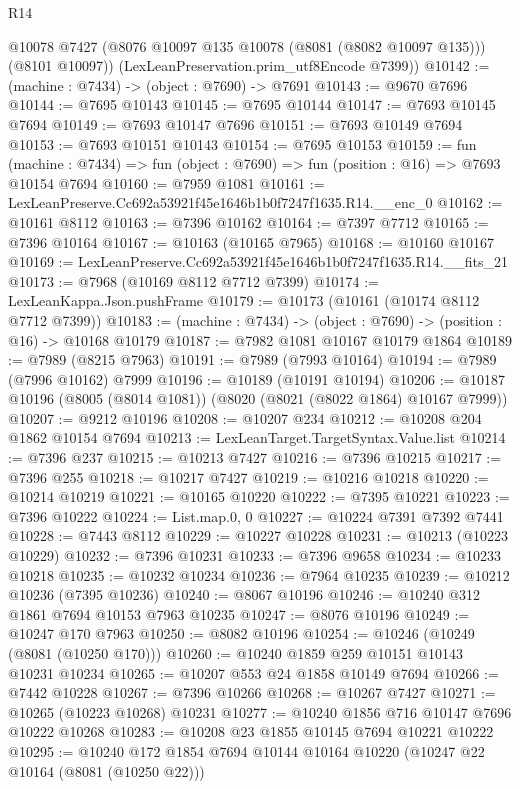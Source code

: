 \begin{lexlean}{R14}
\begin{coremodule}
        @10078
        @7427
        (@8076 @10097 @135 @10078 (@8081 (@8082 @10097 @135)))
        (@8101 @10097))
      (LexLeanPreservation.prim_utf8Encode @7399))
@10142 := (machine : @7434) -> (object : @7690) -> @7691
@10143 := @9670 @7696
@10144 := @7695 @10143
@10145 := @7695 @10144
@10147 := @7693 @10145 @7694
@10149 := @7693 @10147 @7696
@10151 := @7693 @10149 @7694
@10153 := @7693 @10151 @10143
@10154 := @7695 @10153
@10159 := fun (machine : @7434) =>
  fun (object : @7690) => fun (position : @16) => @7693 @10154 @7694
@10160 := @7959 @1081
@10161 := LexLeanPreserve.Cc692a53921f45e1646b1b0f7247f1635.R14.__enc_0
@10162 := @10161 @8112
@10163 := @7396 @10162
@10164 := @7397 @7712
@10165 := @7396 @10164
@10167 := @10163 (@10165 @7965)
@10168 := @10160 @10167
@10169 := LexLeanPreserve.Cc692a53921f45e1646b1b0f7247f1635.R14.__fits_21
@10173 := @7968 (@10169 @8112 @7712 @7399)
@10174 := LexLeanKappa.Json.pushFrame
@10179 := @10173 (@10161 (@10174 @8112 @7712 @7399))
@10183 := (machine : @7434) -> (object : @7690) -> (position : @16) -> @10168 @10179
@10187 := @7982 @1081 @10167 @10179 @1864
@10189 := @7989 (@8215 @7963)
@10191 := @7989 (@7993 @10164)
@10194 := @7989 (@7996 @10162) @7999
@10196 := @10189 (@10191 @10194)
@10206 := @10187 @10196 (@8005 (@8014 @1081)) (@8020 (@8021 (@8022 @1864) @10167 @7999))
@10207 := @9212 @10196
@10208 := @10207 @234
@10212 := @10208 @204 @1862 @10154 @7694
@10213 := LexLeanTarget.TargetSyntax.Value.list
@10214 := @7396 @237
@10215 := @10213 @7427
@10216 := @7396 @10215
@10217 := @7396 @255
@10218 := @10217 @7427
@10219 := @10216 @10218
@10220 := @10214 @10219
@10221 := @10165 @10220
@10222 := @7395 @10221
@10223 := @7396 @10222
@10224 := List.map.{0, 0}
@10227 := @10224 @7391 @7392 @7441
@10228 := @7443 @8112
@10229 := @10227 @10228
@10231 := @10213 (@10223 @10229)
@10232 := @7396 @10231
@10233 := @7396 @9658
@10234 := @10233 @10218
@10235 := @10232 @10234
@10236 := @7964 @10235
@10239 := @10212 @10236 (@7395 @10236)
@10240 := @8067 @10196
@10246 := @10240 @312 @1861 @7694 @10153 @7963 @10235
@10247 := @8076 @10196
@10249 := @10247 @170 @7963
@10250 := @8082 @10196
@10254 := @10246 (@10249 (@8081 (@10250 @170)))
@10260 := @10240 @1859 @259 @10151 @10143 @10231 @10234
@10265 := @10207 @553 @24 @1858 @10149 @7694
@10266 := @7442 @10228
@10267 := @7396 @10266
@10268 := @10267 @7427
@10271 := @10265 (@10223 @10268) @10231
@10277 := @10240 @1856 @716 @10147 @7696 @10222 @10268
@10283 := @10208 @23 @1855 @10145 @7694 @10221 @10222
@10295 := @10240 @172 @1854 @7694 @10144 @10164 @10220 (@10247 @22 @10164 (@8081 (@10250 @22)))

\end{coremodule}
\end{lexlean}
